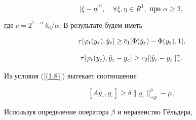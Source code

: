 \begin{pf}
\begin{equation}
 |\xi - \eta |^{\alpha },


 \quad \forall \xi, \eta \in R^{1},\text{ при } \alpha \ge 2,


 \label{n2}


\end{equation}


где $ c = 2^{1-\alpha}\,b_6/\alpha $. В результате будем иметь


\begin{equation}


\tau [ \varphi_{t}(y_\varepsilon), \Hat{y}_\varepsilon] \ge\overline{c}_{1}


[ {\Phi} (\Hat{y}_\varepsilon)-{\Phi}(y_\varepsilon),1 ], \label{5.19}


\end{equation}


%


\begin{equation}


\tau [ \varphi _{t}(y_\varepsilon),\Hat{y}_\varepsilon- y_\varepsilon ]


 \ge


c_2\|\Hat{y}_\varepsilon-y_\varepsilon


\|^{\alpha}_{\alpha }. \label{5.20}


\end{equation}
















Из условия (\ref{(1.8)}) вытекает соотношение


\begin{equation}


[ Ay_\varepsilon , y_\varepsilon ] \ge \delta \| y_\varepsilon \|^p_{+p}-


\mu,  \label{5.22}


\end{equation}


Используя определение оператора $\beta$ и неравенство Г\"е{}льдера,



\end{pf}

